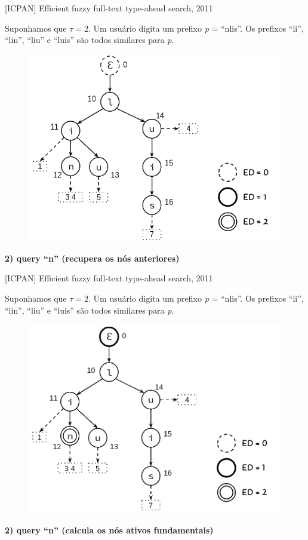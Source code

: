 \documentclass[11pt]{beamer}
\begin{document}
\begin{frame}{[ICPAN] Efficient fuzzy full-text type-ahead search, 2011}
    
    \small
    Suponhamos que $\tau = 2$. Um usuário digita um prefixo \textit{p} = ``nlis''. Os prefixos ``li'', ``lin'', ``liu'' e ``luis'' são todos similares para \textit{p}.

    \begin{figure}
      \includegraphics[scale=0.42]{pictures/icpan_1.png}
      \centering
    \end{figure}
    
    \textbf{2) query ``n'' (recupera os nós anteriores)}
    
\end{frame}

\begin{frame}{[ICPAN] Efficient fuzzy full-text type-ahead search, 2011}
    
    \small
    Suponhamos que $\tau = 2$. Um usuário digita um prefixo \textit{p} = ``nlis''. Os prefixos ``li'', ``lin'', ``liu'' e ``luis'' são todos similares para \textit{p}.

    \begin{figure}
      \includegraphics[scale=0.50]{pictures/ipcan_2.png}
      \centering
    \end{figure}
    
    \textbf{2) query ``n'' (calcula os nós ativos fundamentais)}
    
\end{frame}
\end{document}
